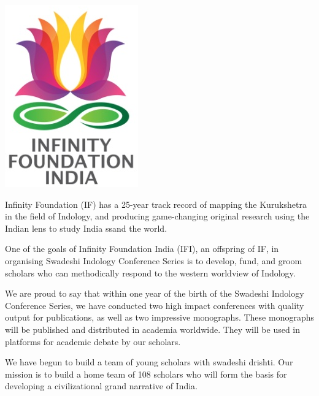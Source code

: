 \thispagestyle{empty}

\centerline{\includegraphics[scale=0.3]{figures/logo.png}}\label{about}
\bigskip


Infinity Foundation (IF) has a 25-year track record of mapping the Kurukshetra in the field of Indology, and producing game-changing original research using the Indian lens to study India ssand the world. 

One of the goals of Infinity Foundation India (IFI), an offspring of IF, in organising Swadeshi Indology Conference Series is to develop, fund, and groom scholars who can methodically respond to the western worldview of Indology.

We are proud to say that within one year of the birth of the Swadeshi Indology Conference Series, we have conducted two high impact conferences with quality output for publications, as well as two impressive monographs. These monographs will be published and distributed in academia worldwide. They will be used in platforms for academic debate by our scholars.

We have begun to build a team of young scholars with swadeshi drishti. Our mission is to build a home team of 108 scholars who will form the basis for developing a civilizational grand narrative of India.
